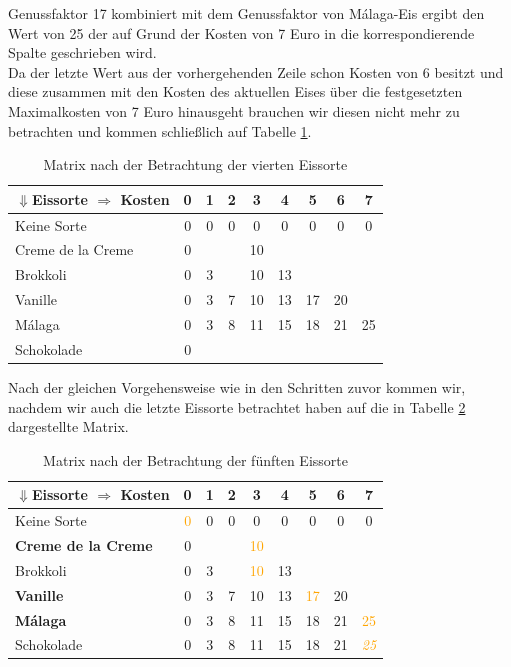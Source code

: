 \documentclass[a4paper, 12pt]{article}
\begin{document}
Genussfaktor 17 kombiniert mit dem Genussfaktor von Málaga-Eis ergibt den Wert von 25 der auf Grund der Kosten von 7 Euro in die korrespondierende Spalte geschrieben wird.\\

Da der letzte Wert aus der vorhergehenden Zeile schon Kosten von 6 besitzt und diese zusammen mit den Kosten des aktuellen Eises über die festgesetzten Maximalkosten von 7 Euro hinausgeht brauchen wir diesen nicht mehr zu betrachten und kommen schließlich auf Tabelle \ref{table:4_Eis}.

\begin{table}[H]
	\begin{center}
		\begin{tabular}{l|cccccccc}
			$\Downarrow$Eissorte $\Rightarrow$ Kosten & 0 & 1 & 2 & 3 & 4 & 5 &
			6 & 7\\
			\hline
			Keine Sorte			& 0 & 0 & 0 & 0	 &	0 &	 0 & 0 & 0	 \\
			Creme de la Creme	& 0 &	&	& 10 &	  &	   &	&	 \\
			Brokkoli			& 0 & 3 &	& 10 & 13 &	   &	&	 \\
			Vanille				& 0 & 3 & 7 & 10 & 13 & 17 & 20 &	 \\
			Málaga				& 0 & 3 & 8 & 11 & 15 & 18 & 21 & 25 \\
			Schokolade			& 0 &	&	&	 &	  &	   &	&	 \\
		\end{tabular}
	\end{center}
\caption{Matrix nach der Betrachtung der vierten Eissorte}
\label{table:4_Eis}
\end{table}

Nach der gleichen Vorgehensweise wie in den Schritten zuvor kommen wir, nachdem wir auch die letzte Eissorte betrachtet haben auf die in Tabelle \ref{table:5_Eis} dargestellte Matrix.

\begin{table}[H]
	\begin{center}
		\begin{tabular}{l|cccccccc}
			$\Downarrow$Eissorte $\Rightarrow$ Kosten & 0 & 1 & 2 & 3 & 4 & 5 &
				6 & 7\\
			\hline
			Keine Sorte			& \textcolor{orange}{0} & 0 & 0 & 0	& 0 & 0 &
				0 & 0\\
			\textbf{Creme de la Creme} & 0 & & & \textcolor{orange}{10} & & &
				&\\
			Brokkoli			& 0 & 3 & & \textcolor{orange}{10} & 13 & &
				&\\
			\textbf{Vanille}	& 0 & 3 & 7 & 10 & 13 & \textcolor{orange}{17} &
				20 &\\
			\textbf{Málaga}		& 0 & 3 & 8 & 11 & 15 & 18 & 21
				& \textcolor{orange}{25}\\
			Schokolade			& 0 & 3 & 8 & 11 & 15 & 18 & 21
				& \textcolor{orange}{\emph{25}}\\
		\end{tabular}
	\end{center}
\caption{Matrix nach der Betrachtung der fünften Eissorte}
\label{table:5_Eis}
\end{table}
\end{document}
